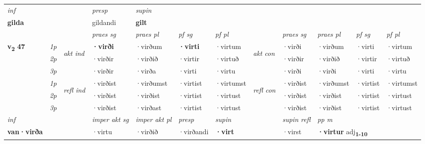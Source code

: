 \begin{longtable}[l]{X>{\footnotesize\itshape}llXXXXlXXXX}
\cmidrule{4-7}
   {\textit{inf}} & &     & \textit{presp} & \textit{supin}   \\*
  {\textbf{gilda}} & &     & gildandi &  \textbf{gilt}   \\*

\midrule

 & &   & \textit{praes sg}  & \textit{praes pl}    & \textit{ pf sg} & \textit{pf pl} & & \textit{praes sg}  & \textit{praes pl}    & \textit{pf sg} & \textit{pf pl }  \\ \cmidrule{4-7} \cmidrule{9-12}
 \multirow{2}{*}{{{\textbf{v{\textsubscript{2}}} \Large{\textbf{47}}}}}  & 1p & \multirow{3}{*}{\begin{turn}{90}\textit{akt ind}\end{turn}} & \textbf{·virði} & ·virðum & \textbf{·virti} & ·virtum & \multirow{3}{*}{\begin{turn}{90}\textit{akt con}\end{turn}} &·virði & ·virðum & ·virti & ·virtum\\*
 & 2p &  &  ·virðir  & ·virðið & ·virtir & ·virtuð & & ·virðir & ·virðið & ·virtir & ·virtuð \\*
 & 3p &  & ·virðir & ·virða & ·virti & ·virtu & & ·virði & ·virði& ·virti & ·virtu \\*
\cmidrule{4-7} \cmidrule{9-12}
 & 1p & \multirow{3}{*}{\begin{turn}{90}\textit{refl ind}\end{turn}}  & ·virðist & ·virðumst & ·virtist & ·virtumst & \multirow{3}{*}{\begin{turn}{90}\textit{refl con}\end{turn}}  &·virðist & ·virðumst & ·virtist & ·virtumst \\*
 & 2p &  & ·virðist & ·virðist & ·virtist & ·virtust & &·virðist & ·virðist & ·virtist & ·virtust \\*
 & 3p  & & ·virðist & ·virðast & ·virtist & ·virtust & & ·virðist & ·virðist& ·virtist & ·virtust \\*
\cmidrule{4-7} \cmidrule{9-12}

   {\textit{inf}} & &  & \textit{imper akt sg} & \textit{imper akt pl}   & \textit{presp} & \textit{supin} && \textit{supin refl} & \textit{pp m} \\*
  {\textbf{van\allowbreak ·virða}} & && ·virtu  & ·virðið   & ·virðandi &  \textbf{·virt} && ·virst & \multicolumn{2}{l}{\textbf{·virtur} adj\textbf{\textsubscript{1-10}}} \\*

\midrule


\end{longtable}

